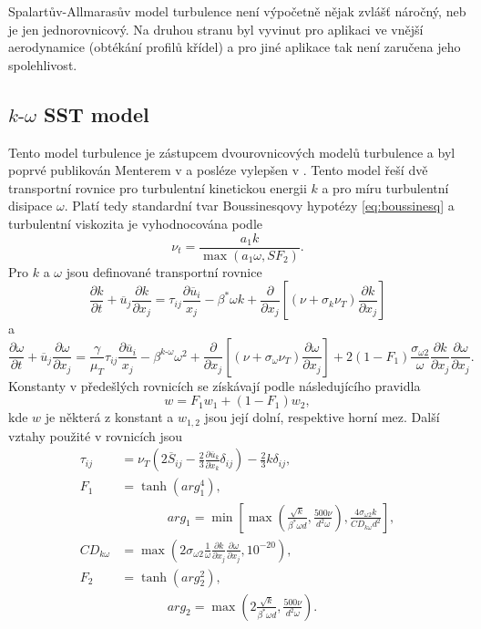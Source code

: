 Spalartův-Allmarasův model turbulence není výpočetně nějak zvlášť náročný, neb je jen jednorovnicový. Na druhou stranu byl vyvinut pro aplikaci ve vnější aerodynamice (obtékání profilů křídel) a pro jiné aplikace tak není zaručena jeho spolehlivost.

\subsection{$k\text{-}\omega$ SST model}

Tento model turbulence je zástupcem dvourovnicových modelů turbulence a byl poprvé publikován Menterem v \cite{menter1994two} a posléze vylepšen v \cite{menter2003ten}. Tento model řeší dvě transportní rovnice pro turbulentní kinetickou energii $ k $ a pro míru turbulentní disipace $ \omega $. Platí tedy standardní tvar Boussinesqovy hypotézy \ref{eq:boussinesq} a turbulentní viskozita je vyhodnocována podle
\begin{equation}
\nu_t = \frac{a_1 k}{\max(a_1 \omega,SF_2)}.
\end{equation}
Pro $ k $ a $\omega$ jsou definované transportní rovnice
\begin{equation}
\frac{\partial k}{\partial t} + \overline{u}_j\frac{\partial k}{\partial x_j} = \tau_{ij}\frac{\partial \overline{u}_i}{x_j} - \beta^\ast \omega k + \frac{\partial}{\partial x_j} \left[ (\nu + \sigma_k \nu_T)\frac{\partial k}{\partial x_j} \right]
\end{equation}
a
\begin{equation}
\frac{\partial \omega}{\partial t} + \overline{u}_j\frac{\partial \omega}{\partial x_j} = \frac{\gamma}{\mu_T}\tau_{ij}\frac{\partial \overline{u}_i}{x_j} - \beta^{k\text{-}\omega} \omega^2 + \frac{\partial}{\partial x_j} \left[ (\nu + \sigma_\omega \nu_T)\frac{\partial \omega}{\partial x_j} \right] + 2(1-F_1)\frac{\sigma_{\omega 2}}{\omega}\frac{\partial k}{\partial x_j}\frac{\partial \omega}{\partial x_j}.
\end{equation}
Konstanty v předešlých rovnicích se získávají podle následujícího pravidla
\begin{equation}
w = F_1 w_1 + (1-F_1)w_2,
\end{equation}
kde $ w $ je některá z konstant a $ w_{1,2} $ jsou její dolní, respektive horní mez. Další vztahy použité v rovnicích jsou
\begin{align*}
\tau_{ij} &= \nu_T \left( 2\overline{S}_{ij} - \frac{2}{3} \frac{\partial \overline{u}_k}{\partial x_k} \delta_{ij} \right) - \frac{2}{3}k\delta_{ij}, \\
F_1 &= \tanh(arg_1^4),\\   &\,\,\,\,\,\,\,\,\,\,\,\,\,\,\,\,\,\,\,\,\,\,arg_1 = \min\left[ \max \left( \frac{\sqrt{k}}{\beta^\ast \omega d}, \frac{500\nu}{d^2 \omega} \right), \frac{4 \sigma_{\omega2} k}{CD_{k\omega}d^2} \right],\\
CD_{k\omega} &= \max\left( 2 \sigma_{\omega2} \frac{1}{\omega} \frac{\partial k}{\partial x_j} \frac{\partial \omega}{\partial x_j}, 10^{-20} \right),\\
F_2 &= \tanh(arg_2^2), \\  &\,\,\,\,\,\,\,\,\,\,\,\,\,\,\,\,\,\,\,\,\,\,arg_2 = \max \left( 2\frac{\sqrt{k}}{\beta^\ast \omega d}, \frac{500\nu}{d^2 \omega} \right).
\end{align*}
